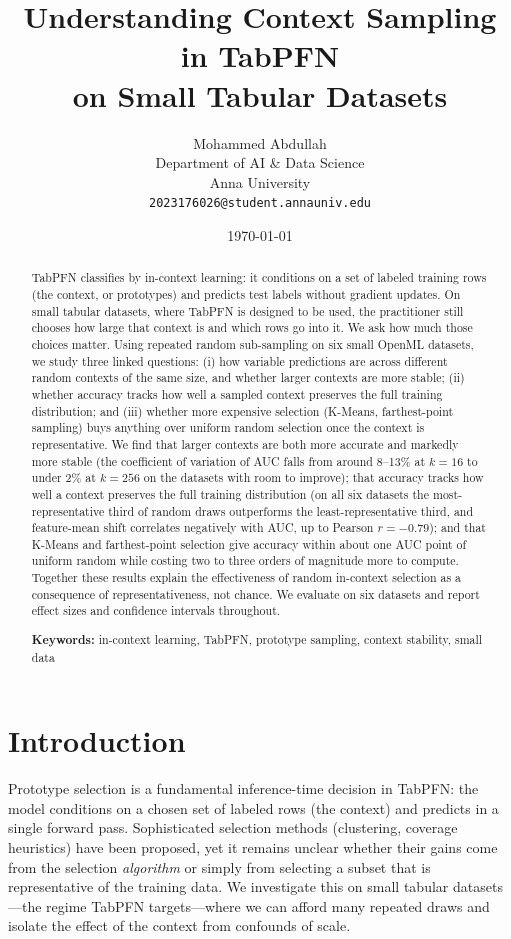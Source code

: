 \documentclass[11pt,a4paper]{article}
\title{Understanding Context Sampling in TabPFN\\ on Small Tabular Datasets}
\author{
  Mohammed Abdullah\\
  Department of AI \& Data Science\\
  Anna University\\
  \texttt{2023176026@student.annauniv.edu}
}
\date{\today}
\begin{document}
\maketitle

\begin{abstract}
TabPFN classifies by in-context learning: it conditions on a set of labeled
training rows (the context, or prototypes) and predicts test labels without
gradient updates. On small tabular datasets, where TabPFN is designed to be
used, the practitioner still chooses how large that context is and which rows
go into it. We ask how much those choices matter. Using repeated random
sub-sampling on six small OpenML datasets, we study three linked questions:
(i) how variable predictions are across different random contexts of the same
size, and whether larger contexts are more stable; (ii) whether accuracy tracks
how well a sampled context preserves the full training distribution; and
(iii) whether more expensive selection (K-Means, farthest-point sampling) buys
anything over uniform random selection once the context is representative.
We find that larger contexts are both more accurate and markedly more stable
(the coefficient of variation of AUC falls from around 8--13\% at $k{=}16$ to
under 2\% at $k{=}256$ on the datasets with room to improve); that accuracy
tracks how well a context preserves the full training distribution (on all six
datasets the most-representative third of random draws outperforms the
least-representative third, and feature-mean shift correlates negatively with
AUC, up to Pearson $r=-0.79$); and that K-Means and farthest-point selection
give accuracy within about one AUC point of uniform random while costing two to
three orders of magnitude more to compute. Together these results explain the
effectiveness of random in-context selection as a consequence of
representativeness, not chance. We evaluate on six datasets and report effect
sizes and confidence intervals throughout.

\textbf{Keywords:} in-context learning, TabPFN, prototype sampling, context
stability, small data
\end{abstract}

\section{Introduction}

Prototype selection is a fundamental inference-time decision in TabPFN: the
model conditions on a chosen set of labeled rows (the context) and predicts in a
single forward pass. Sophisticated selection methods (clustering, coverage
heuristics) have been proposed, yet it remains unclear whether their gains come
from the selection \emph{algorithm} or simply from selecting a subset that is
representative of the training data. We investigate this on small tabular
datasets---the regime TabPFN targets---where we can afford many repeated draws
and isolate the effect of the context from confounds of scale.
\end{document}
